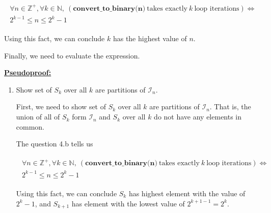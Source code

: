 \documentclass[12pt]{article}
\begin{document}
\begin{enumerate}[a.]
    \begin{align}
        \begin{split}
        \forall n \in \mathbb{Z}^+, \forall k \in \mathbb{N},\: (\textbf{
        convert\_to\_binary(n)}\:\text{takes exactly}\:k\:\text{loop iterations}) \Leftrightarrow
        \\ 2^{k-1} \leq n \leq 2^k -1
        \end{split}
    \end{align}

    \bigskip

    Using this fact, we can conclude $k$ has the highest value of $n$.

    \bigskip

    Finally, we need to evaluate the expression.

    \bigskip

    \begin{mdframed}

    \underline{\textbf{Pseudoproof:}}

    \bigskip

    \begin{enumerate}[1.]
        \item Show set of $S_k$ over all $k$ are partitions of $\mathcal{I}_n$.

        \begin{mdframed}
            First, we need to show set of $S_k$ over all $k$ are partitions of $\mathcal{I}_n$.
            That is, the union of all of $S_k$ form $\mathcal{I}_n$ and $S_k$ over all $k$ do
            not have any elements in common.

            \bigskip

            The question 4.b tells us

            \begin{align}
                \begin{split}
                \forall n \in \mathbb{Z}^+, \forall k \in \mathbb{N},\: (\textbf{
                convert\_to\_binary(n)}\:\text{takes exactly}\:k\:\text{loop iterations}) \Leftrightarrow
                \\ 2^{k-1} \leq n \leq 2^k -1
                \end{split}
            \end{align}

            Using this fact, we can conclude $S_k$ has highest element with the value of $2^k - 1$,
            and $S_{k+1}$ has element with the lowest value of $2^{k+1-1}=2^k$.


\end{mdframed}
\end{enumerate}
\end{mdframed}
\end{enumerate}
\end{document}
